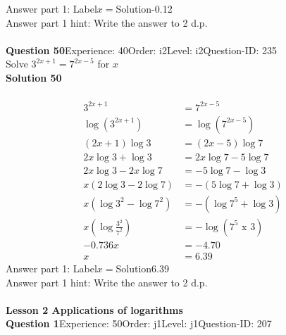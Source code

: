 \documentclass{article}
\begin{document}
Answer part 1: \hspace{10pt}Label\hspace{10pt}$x=$\hspace{10pt}Solution\hspace{10pt}-0.12\\
Answer part 1 hint: \hspace{15pt}Write the answer to 2 d.p.\\
\\[4pt]
\noindent\textbf{Question 50}\hspace{20pt}Experience: 40\hspace{20pt}Order: i2\hspace{20pt}Level: i2\hspace{20pt}Question-ID: 235\\[2pt]
Solve $3^{2x+1}=7^{2x-5}$ for $x$\\[4pt]
\noindent\textbf{Solution 50}\\[2pt]
\\[-35pt]\begin{align*}
3^{2x+1}&=7^{2x-5}\\[2pt]
\log(3^{2x+1})&=\log(7^{2x-5})\\[2pt]
(2x+1)\log3&=(2x-5)\log7\\[2pt]
2x\log3+\log3&=2x\log7-5\log7\\[2pt]
2x\log3-2x\log7&=-5\log7-\log3\\[2pt]
x(2\log3-2\log7)&=-(5\log7+\log3)\\[2pt]
x(\log3^2-\log7^2)&=-(\log7^5+\log3)\\[2pt]
x\left(\log\displaystyle\frac{3^2}{7^2}\right)&=-\log(7^5 \,\, \text{x} \,\, 3)\\[2pt]
-0.736x&=-4.70\\[2pt]
x&=6.39
\end{align*}
Answer part 1: \hspace{10pt}Label\hspace{10pt}$x=$\hspace{10pt}Solution\hspace{10pt}6.39\\
Answer part 1 hint: \hspace{15pt}Write the answer to 2 d.p.\\
\\[4pt]
\noindent\huge{\textbf{Lesson 2 Applications of logarithms}}\\[12pt]
\noindent\textbf{Question 1}\hspace{20pt}Experience: 50\hspace{20pt}Order: j1\hspace{20pt}Level: j1\hspace{20pt}Question-ID: 207\\[2pt]
\end{document}
